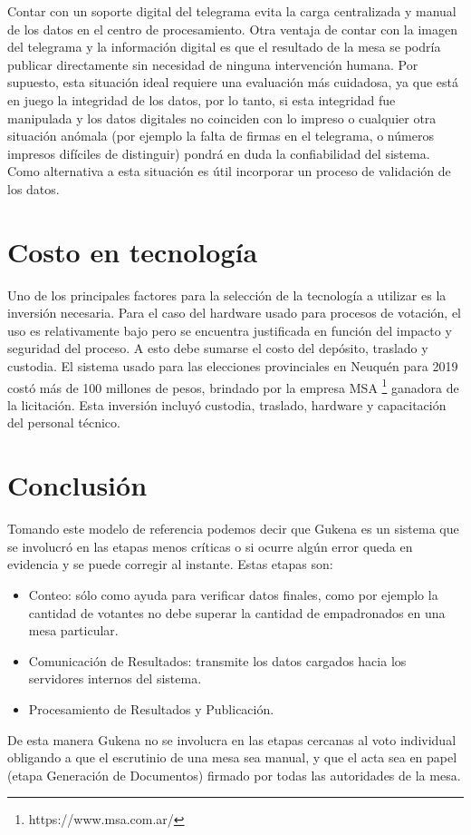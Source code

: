 Contar con un soporte digital del telegrama evita la carga centralizada y manual de los datos en el centro de procesamiento. Otra ventaja de contar con la imagen del telegrama y la información digital es que el resultado de la mesa se podría publicar directamente sin necesidad de ninguna intervención humana. Por supuesto, esta situación ideal requiere una evaluación más cuidadosa, ya que está en juego la integridad de los datos, por lo tanto, si esta integridad fue manipulada y los datos digitales no coinciden con lo impreso o cualquier otra situación anómala (por ejemplo la falta de firmas en el telegrama, o números impresos difíciles de distinguir) pondrá en duda la confiabilidad del sistema. Como alternativa a esta situación es útil incorporar un proceso de validación de los datos.


\section{Costo en tecnología}
Uno de los principales factores para la selección de la tecnología a utilizar es la inversión necesaria. Para el caso del hardware usado para procesos de votación, el uso es relativamente bajo pero se encuentra justificada en función del impacto y seguridad del proceso. A esto debe sumarse el costo del depósito, traslado y custodia. \newline
El sistema usado para las elecciones provinciales en Neuquén para 2019 costó más de 100 millones de pesos, brindado por la empresa MSA \footnote{https://www.msa.com.ar/} ganadora de la licitación. Esta inversión incluyó custodia, traslado, hardware y capacitación del personal técnico.\cite{eleccionesNeuquen}

\section{Conclusión}
Tomando este modelo de referencia podemos decir que Gukena es un sistema que se involucró en las etapas menos críticas o si ocurre algún error queda en evidencia y se puede corregir al instante. Estas etapas son: 
\begin{itemize}
    \item Conteo: sólo como ayuda para verificar datos finales, como por ejemplo la cantidad de votantes no debe superar la cantidad de empadronados en una mesa particular.
    \item Comunicación de Resultados: transmite los datos cargados hacia los servidores internos del sistema.
    \item Procesamiento de Resultados y Publicación.
\end{itemize}
De esta manera Gukena no se involucra en las etapas cercanas al voto individual obligando a que el escrutinio de una mesa sea manual, y que el acta sea en papel (etapa Generación de Documentos) firmado por todas las autoridades de la mesa.
